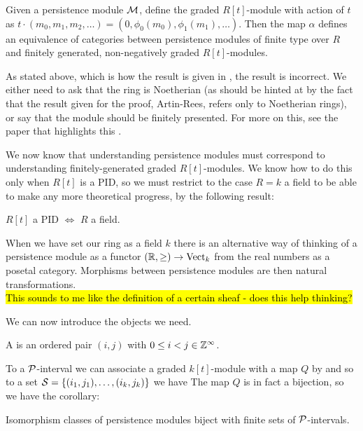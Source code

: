 \documentclass{article}
\begin{document}
\begin{theorem}
	Given a persistence module $\mathcal{M}$, define the graded $R[t]$-module 
with action of $t$ as $t \cdot (m_0, m_1, m_2, \dots) = (0, \phi_0(m_0), \phi_1(m_1), \dots )$. Then the map $\alpha$ defines an equivalence of categories between persistence modules of finite type over $R$ and finitely generated, non-negatively graded $R[t]$-modules.
\end{theorem}
\begin{remark}
	As stated above, which is how the result is given in \cite{Zomorodian2005}, the result is incorrect. We either need to ask that the ring is Noetherian (as should be hinted at by the fact that the result given for the proof, Artin-Rees, refers only to Noetherian rings), or say that the module should be finitely presented. For more on this, see the paper that highlights this \cite{Corbet2018}.
\end{remark}

We now know that understanding persistence modules must correspond to understanding finitely-generated graded $R[t]$-modules. We know how to do this only when $R[t]$ is a PID, so we must restrict to the case $R=k$ a field to be able to make any more theoretical progress, by the following result:
\begin{prop}
	$R[t]$ a PID $\Leftrightarrow$ $R$ a field. 
\end{prop}
\begin{remark}
	When we have set our ring as a field $k$ there is an alternative way of thinking of a persistence module as a functor $(\mathbb{R},\geq) \to \operatorname{Vect}_k$ from the real numbers as a posetal category. Morphisms between persistence modules are then natural transformations. \\
	\hl{This sounds to me like the definition of a certain sheaf - does this help thinking?}
	\end{remark}

 We can now introduce the objects we need. 

\begin{definition}
	A  is an ordered pair $(i,j)$ with $0 \leq i < j  \in \mathbb{Z}^\infty$.
\end{definition}

To a $\mathcal{P}$-interval we can associate a graded $k[t]$-module with a map $Q$ by 
and so to a set $\mathcal{S} = \left\{ (i_1,j_1), \dots, (i_k,j_k) \right\}$ we have 
The map $Q$ is in fact a bijection, so we have the corollary:
\begin{corollary}
	Isomorphism classes of persistence modules biject with finite sets of $\mathcal{P}$-intervals. 
\end{corollary}
\end{document}
